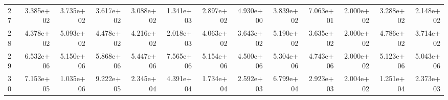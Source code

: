 \begin{table}
\begin{tabular}{lrrrrrrrrrrrr}
27 & 3.385e+02 & 3.735e+02 & 3.617e+02 & 3.088e+02 & 1.341e+03 & 2.897e+02 & 4.930e+00 & 3.839e+02 & 7.063e+01 & 2.000e+02 & 3.288e+02 & 2.148e+02 \\
28 & 4.378e+02 & 5.093e+02 & 4.478e+02 & 4.216e+02 & 2.018e+03 & 4.063e+02 & 3.643e+02 & 5.190e+02 & 3.635e+02 & 2.000e+02 & 4.786e+02 & 3.714e+02 \\
29 & 6.532e+06 & 5.150e+06 & 5.868e+06 & 5.447e+06 & 7.565e+06 & 5.154e+06 & 4.500e+06 & 5.304e+06 & 4.743e+06 & 2.000e+02 & 5.123e+06 & 5.043e+06 \\
30 & 7.153e+05 & 1.035e+06 & 9.222e+05 & 2.345e+04 & 4.391e+04 & 1.734e+04 & 2.592e+03 & 6.799e+04 & 2.923e+03 & 2.004e+02 & 1.251e+04 & 2.373e+03 \\
\bottomrule
\end{tabular}
\end{table}
